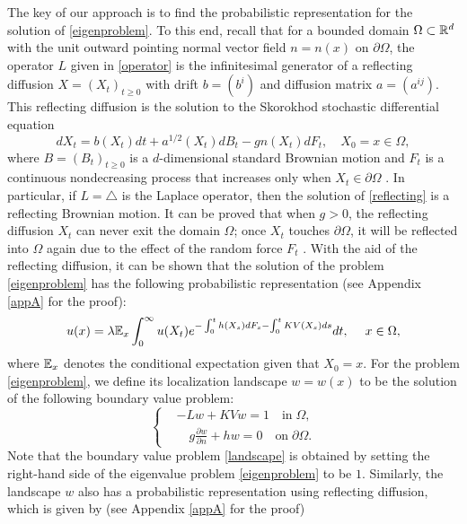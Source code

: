 \documentclass[a4paper,11pt]{article}
\begin{document}
The key of our approach is to find the probabilistic representation for the solution of \eqref{eigenproblem}. To this end, recall that for a bounded domain $\Omega \subset \mathbb{R}^d$ with the unit outward pointing normal vector field $n = n(x)$ on $\partial \Omega$, the operator $L$ given in \eqref{operator} is the infinitesimal generator of a reflecting diffusion $X = (X_t)_{t \geq 0}$ with drift $b = (b^i)$ and diffusion matrix $a = (a^{ij})$. This reflecting diffusion is the solution to the Skorokhod stochastic differential equation
\begin{equation}\label{reflecting}
dX_t = b(X_t) dt + a^{1/2}(X_t) d B_t - g n(X_t) d F_t, \quad X_0 = x\in\Omega,
\end{equation}
where $B = (B_t)_{t\geq 0}$ is a $d$-dimensional standard Brownian motion and $F_t$ is a continuous nondecreasing process that increases only when $X_t \in \partial \Omega$ \cite{1998Diffusions}. In particular, if $L = \triangle$ is the Laplace operator, then the solution of \eqref{reflecting} is a reflecting Brownian motion. It can be proved that when $g > 0$, the reflecting diffusion $X_t$ can never exit the domain $\Omega$; once $X_t$ touches $\partial \Omega$, it will be reflected into $\Omega$ again due to the effect of the random force $F_t$ \cite{1998Diffusions}. With the aid of the reflecting diffusion, it can be shown that the solution of the problem \eqref{eigenproblem} has the following probabilistic representation (see Appendix \ref{appA} for the proof):
\begin{equation}\label{probeigen}
u(x) = \lambda \mathbb{E}_x \int_{0}^{\infty} u(X_t) e^{- \int_{0}^{t} h(X_s) d F_s - \int_{0}^{t} K V(X_s) ds} dt, \quad \; x \in \Omega,
\end{equation}
where $\mathbb{E}_x$ denotes the conditional expectation given that $X_0 = x$. For the problem \eqref{eigenproblem}, we define its localization landscape $w = w(x)$ to be the solution of the following boundary value problem:
\begin{equation}\label{landscape}
\left\{
\begin{split}
& - L w + K V w = 1 \quad \textrm{in} \; \Omega, \\
& \quad g \frac{\partial w}{\partial n} + h w = 0 \quad \textrm{on} \; \partial \Omega.
\end{split}
\right.
\end{equation}
Note that the boundary value problem \eqref{landscape} is obtained by setting the right-hand side of the eigenvalue problem \eqref{eigenproblem} to be $1$. Similarly, the landscape $w$ also has a probabilistic representation using reflecting diffusion, which is given by (see Appendix \ref{appA} for the proof)
\end{document}
